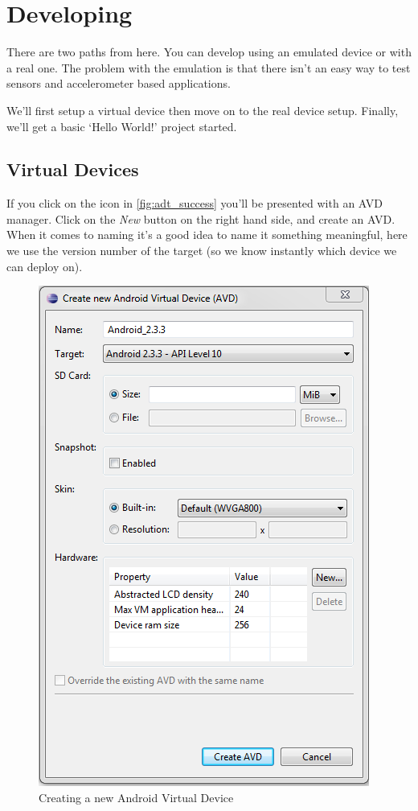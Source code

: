 \section{Developing}

There are two paths from here. You can develop using an emulated device or with a real one. The problem with the emulation is that there isn't an easy way to test sensors and accelerometer based applications.

We'll first setup a virtual device then move on to the real device setup. Finally, we'll get a basic `Hello World!' project started.

\subsection{Virtual Devices}

If you click on the icon in \ref{fig:adt_success} you'll be presented with an AVD manager. Click on the \textit{New} button on the right hand side, and create an AVD. When it comes to naming it's a good idea to name it something meaningful, here we use the version number of the target (so we know instantly which device we can deploy on).

\begin{figure}[!ht]
  \includegraphics[width=\textwidth]{./images/new_avd.png}%
  \caption{Creating a new Android Virtual Device}
  \label{fig:new_avd}
\end{figure}


